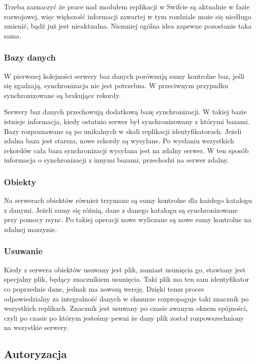 Trzeba zaznaczyć że prace nad modułem replikacji w Swifcie są aktualnie w fazie rozwojowej, więc większość informacji zawartej w tym rozdziale może się niedługo zmienić, bądź już jest nieaktualna. Niemniej ogólna idea zapewne pozostanie taka sama.

\subsubsection{Bazy danych}\label{sub:bazy danych}

W pierwszej kolejności serwery baz danych porównują sumy kontrolne baz, jeśli się zgadzają, synchronizacja nie jest potrzebna. W przeciwnym przypadku synchronizowane są brakujące rekordy.

Serwery baz danych przechowują dodatkową bazę synchronizacji. W takiej bazie istnieje informacja, kiedy ostatnio serwer był synchronizowany z którymi bazami. Bazy rozpoznawane są po unikalnych w skali replikacji identyfikatorach. Jeżeli zdalna baza jest starsza, nowe rekordy są wysyłane. Po wysłaniu wszystkich rekordów cała baza synchronizacji wysyłana jest na zdalny serwer. W ten sposób informacja o synchronizacji z innymi bazami, przechodzi na serwer zdalny.

\subsubsection{Obiekty}\label{sub:obiekty}

Na serwerach obiektów również trzymane są sumy kontrolne dla każdego katalogu z danymi. Jeżeli sumy się różnią, dane z danego katalogu są synchronizowane przy pomocy rsync. Po takiej operacji nowe wyliczane są nowe sumy kontrolne na zdalnej maszynie.

\subsubsection{Usuwanie}\label{sub:usuwanie}

Kiedy z serwera obiektów usuwany jest plik, zamiast usunięcia go, stawiany jest specjalny plik, będący znacznikiem usunięcia. Taki plik ma ten sam identyfikator co poprzednie dane, jednak ma nowszą wersję. Dzięki temu proces odpowiedzialny za integralność danych w chmurze rozpropaguje taki znacznik po wszystkich replikach. Znacznik jest usuwany po czasie zwanym oknem spójności, czyli po czasie po którym jesteśmy pewni że dany plik został rozpowszechniony na wszystkie serwery.

\subsection{Autoryzacja}\label{sec:autoryzacja}

